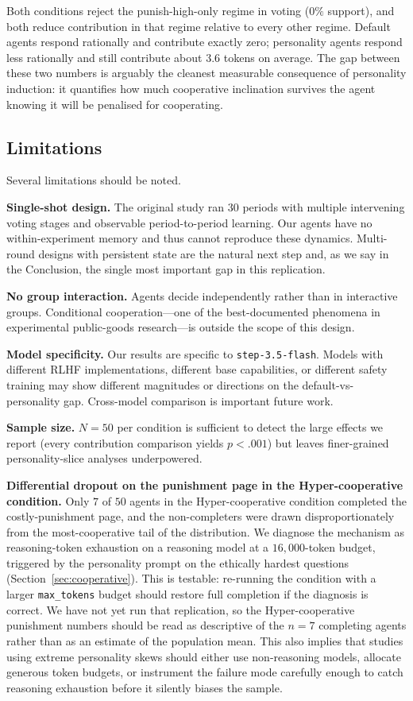 \documentclass[12pt, a4paper]{article}
\begin{document}
Both conditions reject the punish-high-only regime in voting ($0\%$ support), and both reduce contribution in that regime relative to every other regime. Default agents respond rationally and contribute exactly zero; personality agents respond less rationally and still contribute about $3.6$ tokens on average. The gap between these two numbers is arguably the cleanest measurable consequence of personality induction: it quantifies how much cooperative inclination survives the agent knowing it will be penalised for cooperating.

\subsection{Limitations}

Several limitations should be noted.

\textbf{Single-shot design.} The original study ran $30$ periods with multiple intervening voting stages and observable period-to-period learning. Our agents have no within-experiment memory and thus cannot reproduce these dynamics. Multi-round designs with persistent state are the natural next step and, as we say in the Conclusion, the single most important gap in this replication.

\textbf{No group interaction.} Agents decide independently rather than in interactive groups. Conditional cooperation---one of the best-documented phenomena in experimental public-goods research---is outside the scope of this design.

\textbf{Model specificity.} Our results are specific to \texttt{step-3.5-flash}. Models with different RLHF implementations, different base capabilities, or different safety training may show different magnitudes or directions on the default-vs-personality gap. Cross-model comparison is important future work.

\textbf{Sample size.} $N=50$ per condition is sufficient to detect the large effects we report (every contribution comparison yields $p<.001$) but leaves finer-grained personality-slice analyses underpowered.

\textbf{Differential dropout on the punishment page in the Hyper-cooperative condition.} Only $7$ of $50$ agents in the Hyper-cooperative condition completed the costly-punishment page, and the non-completers were drawn disproportionately from the most-cooperative tail of the distribution. We diagnose the mechanism as reasoning-token exhaustion on a reasoning model at a $16{,}000$-token budget, triggered by the personality prompt on the ethically hardest questions (Section~\ref{sec:cooperative}). This is testable: re-running the condition with a larger \texttt{max\_tokens} budget should restore full completion if the diagnosis is correct. We have not yet run that replication, so the Hyper-cooperative punishment numbers should be read as descriptive of the $n=7$ completing agents rather than as an estimate of the population mean. This also implies that studies using extreme personality skews should either use non-reasoning models, allocate generous token budgets, or instrument the failure mode carefully enough to catch reasoning exhaustion before it silently biases the sample.
\end{document}
